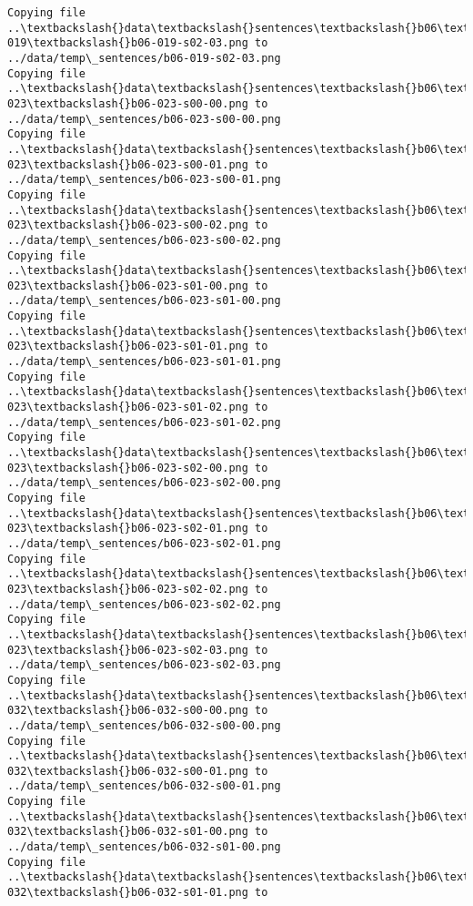 \documentclass[11pt]{article}
\begin{document}
\begin{Verbatim}[commandchars=\\\{\}]
Copying file ..\textbackslash{}data\textbackslash{}sentences\textbackslash{}b06\textbackslash{}b06-019\textbackslash{}b06-019-s02-03.png to
../data/temp\_sentences/b06-019-s02-03.png
Copying file ..\textbackslash{}data\textbackslash{}sentences\textbackslash{}b06\textbackslash{}b06-023\textbackslash{}b06-023-s00-00.png to
../data/temp\_sentences/b06-023-s00-00.png
Copying file ..\textbackslash{}data\textbackslash{}sentences\textbackslash{}b06\textbackslash{}b06-023\textbackslash{}b06-023-s00-01.png to
../data/temp\_sentences/b06-023-s00-01.png
Copying file ..\textbackslash{}data\textbackslash{}sentences\textbackslash{}b06\textbackslash{}b06-023\textbackslash{}b06-023-s00-02.png to
../data/temp\_sentences/b06-023-s00-02.png
Copying file ..\textbackslash{}data\textbackslash{}sentences\textbackslash{}b06\textbackslash{}b06-023\textbackslash{}b06-023-s01-00.png to
../data/temp\_sentences/b06-023-s01-00.png
Copying file ..\textbackslash{}data\textbackslash{}sentences\textbackslash{}b06\textbackslash{}b06-023\textbackslash{}b06-023-s01-01.png to
../data/temp\_sentences/b06-023-s01-01.png
Copying file ..\textbackslash{}data\textbackslash{}sentences\textbackslash{}b06\textbackslash{}b06-023\textbackslash{}b06-023-s01-02.png to
../data/temp\_sentences/b06-023-s01-02.png
Copying file ..\textbackslash{}data\textbackslash{}sentences\textbackslash{}b06\textbackslash{}b06-023\textbackslash{}b06-023-s02-00.png to
../data/temp\_sentences/b06-023-s02-00.png
Copying file ..\textbackslash{}data\textbackslash{}sentences\textbackslash{}b06\textbackslash{}b06-023\textbackslash{}b06-023-s02-01.png to
../data/temp\_sentences/b06-023-s02-01.png
Copying file ..\textbackslash{}data\textbackslash{}sentences\textbackslash{}b06\textbackslash{}b06-023\textbackslash{}b06-023-s02-02.png to
../data/temp\_sentences/b06-023-s02-02.png
Copying file ..\textbackslash{}data\textbackslash{}sentences\textbackslash{}b06\textbackslash{}b06-023\textbackslash{}b06-023-s02-03.png to
../data/temp\_sentences/b06-023-s02-03.png
Copying file ..\textbackslash{}data\textbackslash{}sentences\textbackslash{}b06\textbackslash{}b06-032\textbackslash{}b06-032-s00-00.png to
../data/temp\_sentences/b06-032-s00-00.png
Copying file ..\textbackslash{}data\textbackslash{}sentences\textbackslash{}b06\textbackslash{}b06-032\textbackslash{}b06-032-s00-01.png to
../data/temp\_sentences/b06-032-s00-01.png
Copying file ..\textbackslash{}data\textbackslash{}sentences\textbackslash{}b06\textbackslash{}b06-032\textbackslash{}b06-032-s01-00.png to
../data/temp\_sentences/b06-032-s01-00.png
Copying file ..\textbackslash{}data\textbackslash{}sentences\textbackslash{}b06\textbackslash{}b06-032\textbackslash{}b06-032-s01-01.png to

\end{Verbatim}
\end{document}
